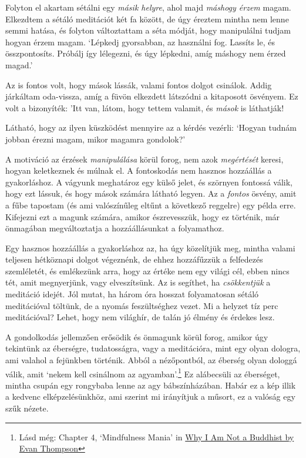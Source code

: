 Folyton el akartam sétálni egy \emph{másik helyre}, ahol majd
\emph{máshogy érzem} magam. Elkezdtem a sétáló meditációt két fa között,
de úgy éreztem mintha nem lenne semmi hatása, és folyton változtattam a
séta módját, hogy manipulálni tudjam hogyan érzem magam. `Lépkedj
gyorsabban, az használni fog. Lassíts le, és összpontosíts. Próbálj így
lélegezni, és úgy lépkedni, amíg máshogy nem érzed magad.'

Az is fontos volt, hogy mások lássák, valami fontos dolgot csinálok.
Addig járkáltam oda-vissza, amíg a füvön elkezdett látszódni a
kitaposott ösvényem. Ez volt a bizonyíték: 'Itt van, látom, hogy tettem
valamit, és \emph{mások} is láthatják!

Látható, hogy az ilyen küszködést mennyire az a kérdés vezérli: `Hogyan
tudnám jobban érezni magam, mikor magamra gondolok?'

\enlargethispage*{\baselineskip}

A motiváció az érzések \emph{manipulálása} körül forog, nem azok
\emph{megértését} keresi, hogyan keletkeznek és múlnak el. A fontoskodás
nem hasznos hozzáállás a gyakorláshoz. A vágyunk meghatároz egy külső
jelet, és szörnyen fontossá válik, hogy ezt lássuk, és hogy mások
számára látható legyen. Az a \emph{fontos} ösvény, amit a fűbe tapostam
(és ami valószínűleg eltűnt a következő reggelre) egy példa erre.
Kifejezni ezt a magunk számára, amikor észrevesszük, hogy ez történik,
már önmagában megváltoztatja a hozzáállásunkat a folyamathoz.

Egy hasznos hozzáállás a gyakorláshoz az, ha úgy közelítjük meg, mintha
valami teljesen hétköznapi dolgot végeznénk, de ehhez hozzáfűzzük a
felfedezés szemléletét, és emlékezünk arra, hogy az értéke nem egy
világi cél, ebben nincs tét, amit megnyerjünk, vagy elveszítsünk. Az is
segíthet, ha \emph{csökkentjük} a meditáció idejét. Jól mutat, ha három
óra hosszat folyamatosan sétáló meditációval töltünk, de a nyomás
feszültséghez vezet. Mi a helyzet tíz perc meditációval? Lehet, hogy nem
világhír, de talán jó élmény és érdekes lesz.


A gondolkodás jellemzően erősödik és önmagunk körül forog, amikor úgy
tekintünk az éberségre, tudatosságra, vagy a meditációra, mint egy olyan
dologra, ami valahol a fejünkben történik. Abból a nézőpontból, az
éberség olyan dologgá válik, amit `nekem kell csinálnom az
agyamban'.\footnote{Lásd még: Chapter 4, `Mindfulness Mania' in
  \href{https://www.goodreads.com/book/show/44439993-why-i-am-not-a-buddhist}{Why
  I Am Not a Buddhist by Evan Thompson}} Ez alábecsüli az éberséget,
mintha csupán egy rongybaba lenne az agy bábszínházában. Habár ez a kép
illik a kedvenc elképzelésünkhöz, ami szerint mi irányítjuk a műsort, ez
a valóság egy szűk nézete.


